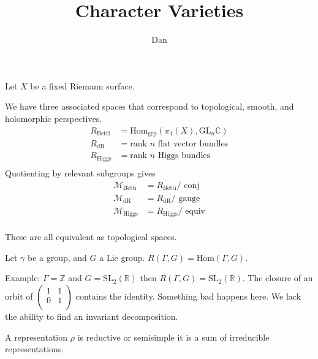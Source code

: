 % 


\title{Character Varieties}
\author{Dan} 
\date{}

 
\maketitle

Let $X$ be a fixed Riemann surface. 

We have three associated spaces that correspond to topological, smooth, and holomorphic perspectives. 
\begin{align}
    R_{\mbox{Betti} } & = \mathrm{Hom} _{\mathrm{grp}} ( \pi_1 (X) , \mathrm{GL}_n \mathbb{C} ) \\
    R_{\mbox{dR} } & = \mbox{rank $n$ flat vector bundles} \\
    R_{\mbox{Higgs} } & = \mbox{rank $n$ Higgs bundles} \\
\end{align}
Quotienting by relevant subgroups gives 
\begin{align}
    \mathcal{M}_{\mbox{Betti} } & =  R_{\mbox{Betti} } / \mbox{ conj} \\
    \mathcal{M}_{\mbox{dR} } &     =  R_{\mbox{dR} } / \mbox{ gauge} \\
    \mathcal{M}_{\mbox{Higgs} } &   = R_{\mbox{Higgs} } / \mbox{ equiv} \\
\end{align}

These are all equivalent as topological spaces. 

Let $\gamma$ be a group, and $ G$ a Lie group. 
$R(\Gamma, G) = \mathrm{Hom}(\Gamma, G) $. 

Example: $ \Gamma = \mathbb{Z}  $ and $ G = \mathrm{SL}_2 ( \mathbb{R} ) $ then $ R(\Gamma, G) = \mathrm{SL}_2 ( \mathbb{R} ) $. 
The closure of an orbit of $ \left( \begin{array}{rr} 1 & 1 \\ 0 & 1 \\ \end{array} \right) $ contains the identity. 
Something bad happens here. 
We lack the ability to find an invariant decomposition. 

\begin{definition}
A representation $ \rho $ is reductive or semisimple it is a sum of irreducible representations. 
\end{definition}

